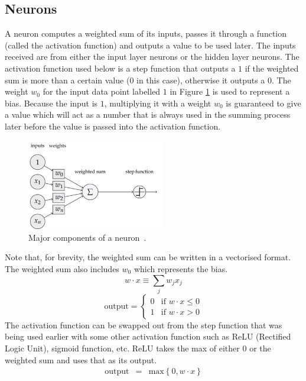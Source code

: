 \documentclass[12pt]{article}
\begin{document}
\subsection{Neurons}
A neuron computes a weighted sum of its inputs, passes it through a function (called the activation function) and outputs a value to be used later. The inputs received are from either the input layer neurons or the hidden layer neurons. The activation function used below is a step function that outputs a $1$ if the weighted sum is more than a certain value ($0$ in this case), otherwise it outputs a $0$. The weight $w_0$ for the input data point labelled $1$ in Figure \ref{fig:neuron} is used to represent a bias. Because the input is $1$, multiplying it with a weight $w_0$ is guaranteed to give a value which will act as a number that is always used in the summing process later before the value is passed into the activation function. 
\begin{figure}[H]
	\centering
	\includegraphics[width=6cm]{resources/neuron.png}
	\caption{Major components of a neuron~\cite{web:neuron}.}
	\label{fig:neuron}
\end{figure}
\noindent Note that, for brevity, the weighted sum can be written in a vectorised format. The weighted sum also includes $w_0$ which represents the bias.
$$w \cdot x \equiv \sum_j w_j x_j$$
$$  \mbox{output} = \left\{ 
    \begin{array}{ll} 
      0 & \mbox{if } w\cdot x \leq 0 \\
      1 & \mbox{if } w\cdot x > 0
    \end{array}
  \right.
$$
The activation function can be swapped out from the step function that was being used earlier with some other activation function such as ReLU (Rectified Logic Unit), sigmoid function, etc. ReLU takes the max of either 0 or the weighted sum and uses that as its output. 
\begin{eqnarray}
  \mbox{output}&=& \mbox{max}\left\{0,w\cdot x\right\}
\end{eqnarray}
\end{document}
